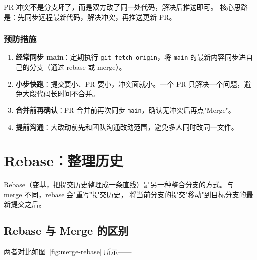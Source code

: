 \documentclass[12pt,a4paper,openany]{ctexbook}
\begin{document}
\begin{infobox}
PR 冲突不是分支坏了，而是双方改了同一处代码，解决后推送即可。
核心思路是：先同步远程最新代码，解决冲突，再推送更新 PR。
\end{infobox}

\subsubsection{预防措施}

\begin{enumerate}[leftmargin=1.5em]
  \item \textbf{经常同步 main}：定期执行 \texttt{git fetch origin}，将 \texttt{main} 的最新内容同步进自己的分支（通过 rebase 或 merge）。
  \item \textbf{小步快跑}：提交要小、PR 要小，冲突面就小。一个 PR 只解决一个问题，避免大段代码长时间不合并。
  \item \textbf{合并前再确认}：PR 合并前再次同步 \texttt{main}，确认无冲突后再点"Merge"。
  \item \textbf{提前沟通}：大改动前先和团队沟通改动范围，避免多人同时改同一文件。
\end{enumerate}

\section{Rebase：整理历史}

Rebase（变基，把提交历史整理成一条直线）是另一种整合分支的方式。与 merge 不同，rebase 会"重写"提交历史，
将当前分支的提交"移动"到目标分支的最新提交之后。

\subsection{Rebase 与 Merge 的区别}

两者对比如图~\ref{fig:merge-rebase} 所示——
\end{document}

